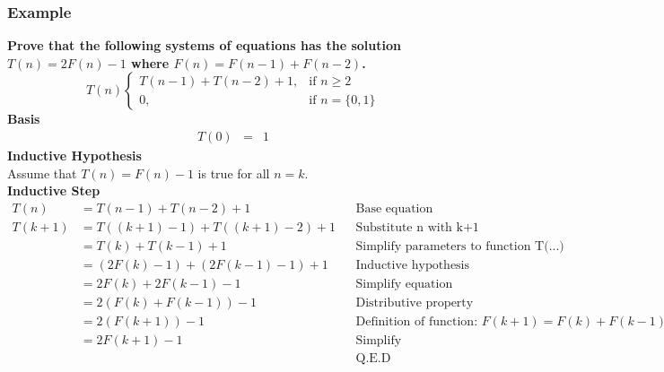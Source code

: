 \subsubsection{Example}
\textbf{Prove that the following systems of equations has the solution $T(n) = 2F(n) - 1$ where $F(n) = F(n-1) + F(n-2)$.}
$$
T(n) \begin{cases}
T(n-1) + T(n-2) + 1, & \mbox{if } n \geq 2\\
0, & \mbox{if } n = \{0,1\}
\end{cases}
$$
\textbf{Basis}
\begin{eqnarray*}
	T(0) &=& 1
\end{eqnarray*}
\textbf{Inductive Hypothesis}\\
Assume that $T(n) = F(n) - 1$ is true for all $n = k$.\\
\textbf{Inductive Step}
\begin{align*}
	T(n) 	&= T(n-1) + T(n-2) + 1					&& \text{Base equation}\\
	T(k+1) 	&= T((k+1) - 1) + T((k+1) - 2) + 1 		&& \text{Substitute n with k+1}\\
			&= T(k) + T(k-1) + 1					&& \text{Simplify parameters to function T(...)}\\
			&= (2F(k) - 1) + (2F(k-1) - 1) + 1		&& \text{Inductive hypothesis}\\
			&= 2F(k) + 2F(k-1) - 1					&& \text{Simplify equation}\\
			&= 2(F(k) + F(k-1)) - 1					&& \text{Distributive property}\\
			&= 2(F(k+1)) - 1						&& \text{Definition of function: } F(k+1) = F(k) + F(k-1)\\
			&= 2F(k+1) - 1							&& \text{Simplify}\\
			&										&& \text{Q.E.D}
\end{align*}